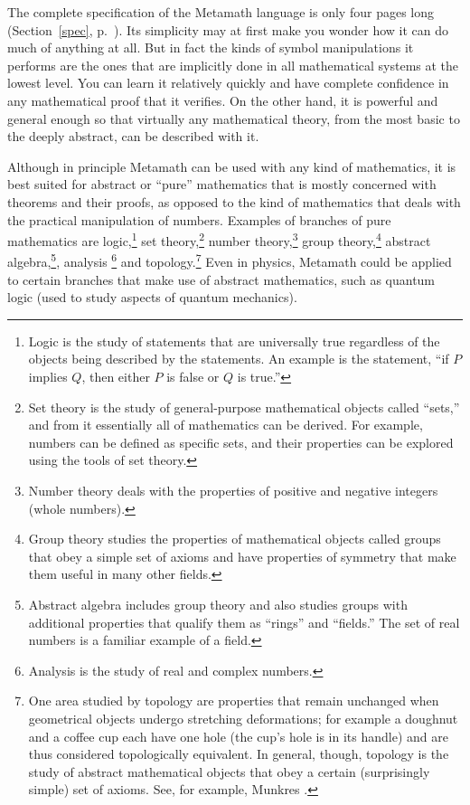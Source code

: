 The complete specification of the Metamath language is only four pages long
(Section~\ref{spec}, p.~\pageref{spec}).  Its simplicity may at first make you
wonder how it can do much of anything at all.  But in fact the kinds of
symbol manipulations it performs are the ones that are implicitly done in all
mathematical systems at the lowest level.  You can learn it relatively quickly
and have complete confidence in any mathematical proof that it verifies.  On
the other hand, it is powerful and general enough so that virtually any
mathematical theory, from the most basic to the deeply abstract, can be
described with it.

Although in principle Metamath can be used with any
kind of mathematics, it is best suited for abstract or ``pure'' mathematics
that is mostly concerned with theorems and their proofs, as opposed to the
kind of mathematics that deals with the practical manipulation of numbers.
Examples of branches of pure mathematics are logic,\footnote{Logic
is the study of statements that are universally true regardless of the objects
being described by the statements.  An example is the statement, ``if $P$
implies $Q$, then either $P$ is false or $Q$ is true.''} set theory,\footnote{Set theory is the study of general-purpose mathematical objects called
``sets,'' and from it essentially all of mathematics can be derived.  For
example, numbers can be defined as specific sets, and their properties
can be explored using the tools of set theory.} number theory,\footnote{Number theory deals with the properties of positive and
negative integers (whole numbers).} group theory,\footnote{Group theory studies the properties of mathematical objects
called groups that obey a simple set of axioms and have properties of symmetry
that make them useful in many other fields.} abstract algebra,\footnote{Abstract algebra includes group theory and also studies
groups with additional properties that qualify them as ``rings'' and
``fields.''  The set of real numbers is a familiar example of a field.},
analysis \footnote{Analysis is
the study of real and complex numbers.} and
topology.\footnote{One area studied by topology are properties
that remain unchanged when geometrical objects undergo stretching
deformations; for example a doughnut and a coffee cup each have one hole (the
cup's hole is in its handle) and are thus considered topologically
equivalent.  In general, though, topology is the study of abstract
mathematical objects that obey a certain (surprisingly simple) set of axioms.
See, for example, Munkres \cite{Munkres}.} Even in
physics, Metamath could be applied to certain branches that make use of
abstract mathematics, such as quantum logic (used to study
aspects of quantum mechanics).

